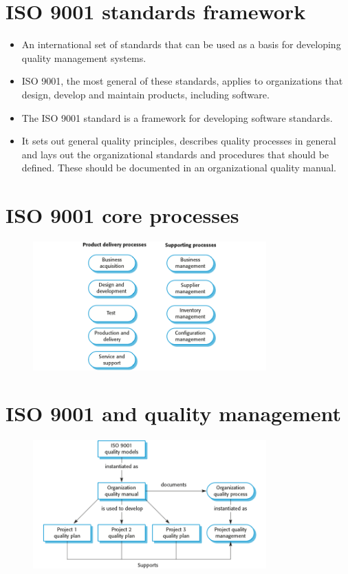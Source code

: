 \section {ISO 9001 standards framework}
\begin{itemize}
\item An international set of standards that can be used as a basis for developing quality management systems.

\item ISO 9001, the most general of these standards, applies to organizations that design, develop and maintain products, including software.

\item The ISO 9001 standard is a framework for developing software standards.

  \item It sets out general quality principles, describes quality processes in general and lays out the organizational standards and procedures that should be defined. These should be documented in an organizational quality manual.

\end{itemize}
\section {ISO 9001 core processes}
\begin{figure}[h!]
    \centering
    \includegraphics[width = 0.8\textwidth]{./figures/L7_3.png}
    \caption{}
    \label{fig:L7_3}
\end{figure}


\newpage
\section {ISO 9001 and quality management}
\begin{figure}[h!]
    \centering
    \includegraphics[width = 0.8\textwidth]{./figures/L7_4.png}
    \caption{}
    \label{fig:L7_4}
\end{figure}




